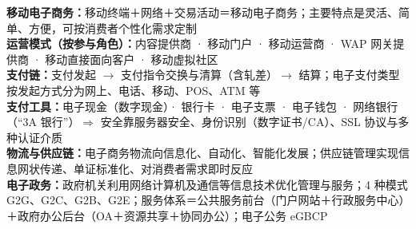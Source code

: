 \documentclass[a4paper,11pt]{article}
\begin{document}

\begin{knowmap}
\textbf{移动电子商务：}移动终端＋网络＋交易活动＝移动电子商务；主要特点是灵活、简单、方便，可按消费者个性化需求定制\\[2pt]
\textbf{运营模式（按参与角色）：}内容提供商 · 移动门户 · 移动运营商 · WAP 网关提供商 · 移动直接面向客户 · 移动虚拟社区\\[2pt]
\textbf{支付链：}支付发起 $\rightarrow$ 支付指令交换与清算（含轧差）$\rightarrow$ 结算；电子支付类型按发起方式分为网上、电话、移动、POS、ATM 等\\[2pt]
\textbf{支付工具：}电子现金（数字现金）· 银行卡 · 电子支票 · 电子钱包 · 网络银行（“3A 银行”）$\Rightarrow$ 安全靠服务器安全、身份识别（数字证书/CA）、SSL 协议与多种认证介质\\[2pt]
\textbf{物流与供应链：}电子商务物流向信息化、自动化、智能化发展；供应链管理实现信息网状传递、单证标准化、对消费者需求即时反应\\[2pt]
\textbf{电子政务：}政府机关利用网络计算机及通信等信息技术优化管理与服务；4 种模式 G2G、G2C、G2B、G2E；服务体系＝公共服务前台（门户网站＋行政服务中心）＋政府办公后台（OA＋资源共享＋协同办公）；电子公务 eGBCP
\end{knowmap}
\end{document}
